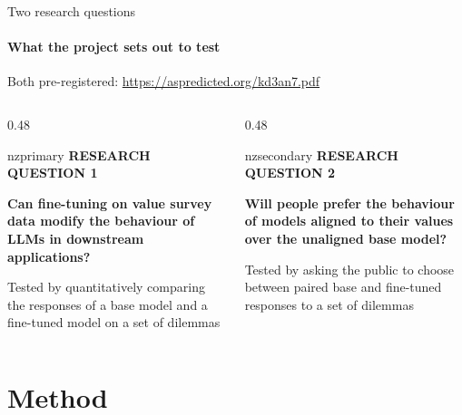 \documentclass[aspectratio=169,11pt,t]{beamer}
\newcommand{\nzlabel}[1]{%
  {\sffamily\bfseries\fontsize{7}{8}\selectfont
   \color{nzsecondary}\MakeUppercase{#1}}}
\begin{document}
\begin{frame}{Two research questions}
  \framesubtitle{What the project sets out to test}
  \footnotesize Both pre-registered: \url{https://aspredicted.org/kd3an7.pdf}
  \pause
  \begin{columns}[T,onlytextwidth]
    \begin{column}{0.48\textwidth}
      \begin{nzcard}[equal height group=rq]{nzprimary}
        \nzlabel{Research question 1}\par\vspace{2mm}
        {\large\bfseries\color{nzprimary}Can fine-tuning on value survey data modify the behaviour of LLMs in downstream applications?}\par
        \vspace{2mm}
        {\footnotesize\color{nzmuted}Tested by quantitatively comparing the responses of a base model and a fine-tuned model on a set of dilemmas}
      \end{nzcard}
    \end{column}
    \hfill 
    \pause
    \begin{column}{0.48\textwidth}
      \begin{nzcard}[equal height group=rq]{nzsecondary}
        \nzlabel{Research question 2}\par\vspace{2mm}
        {\large\bfseries\color{nzprimary}Will people prefer the behaviour of
         models aligned to their values over the unaligned base model?}\par
        \vspace{2mm}
        {\footnotesize\color{nzmuted}Tested by asking the public to choose between paired base and fine-tuned responses to a set of dilemmas}
      \end{nzcard}
    \end{column}
  \end{columns}
\end{frame}

\section{Method}
\end{document}
